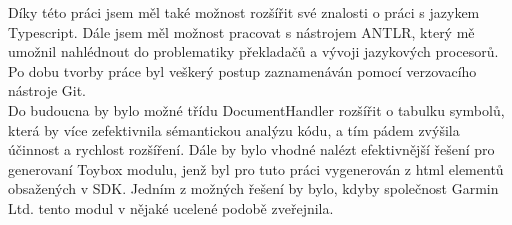Díky této práci jsem měl také možnost rozšířit své znalosti o práci s jazykem Typescript. Dále jsem měl možnost pracovat s nástrojem ANTLR, který mě umožnil nahlédnout do problematiky překladačů a vývoji jazykových procesorů. Po dobu tvorby práce byl veškerý postup zaznamenáván pomocí verzovacího nástroje Git.
\\
Do budoucna by bylo možné třídu DocumentHandler rozšířit o tabulku symbolů, která by více zefektivnila sémantickou analýzu kódu, a tím pádem zvýšila účinnost a rychlost rozšíření. Dále by bylo vhodné nalézt efektivnější řešení pro generovaní Toybox modulu, jenž byl pro tuto práci vygenerován z html elementů obsažených v SDK. Jedním z možných řešení by bylo, kdyby společnost Garmin Ltd. \cite{GARMIN_OFFICIAL} tento modul v nějaké ucelené podobě zveřejnila.

\endinput